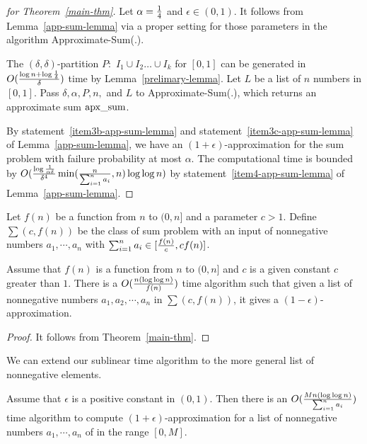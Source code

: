 \documentclass[runningheads]{llncs}
\newcommand{\appsum}{{\rm apx\_sum}}
\begin{document}
\begin{proof}[for Theorem~\ref{main-thm}]
Let $\alpha={1\over 4}$ and $\epsilon\in (0,1)$.  It follows from
Lemma~\ref{app-sum-lemma} via a proper setting for those parameters
in the algorithm Approximate-Sum(.).

 The $(\delta,\delta)$-partition $P:$ $I_1\cup
I_2\ldots \cup I_k$ for $[0,1]$ can be generated in $O({\log n+\log
{1\over \delta}\over \delta})$ time by Lemma~\ref{prelimary-lemma}.
Let $L$ be a list of $n$ numbers in $[0,1]$. Pass $\delta, \alpha,
P, n,$ and $L$ to Approximate-Sum(.), which returns an approximate
sum $\appsum$.

 By statement~\ref{item3b-app-sum-lemma} and
statement~\ref{item3c-app-sum-lemma} of Lemma~\ref{app-sum-lemma},
we have an $(1+\epsilon)$-approximation for the sum problem with
failure probability at most $\alpha$. The computational time is
bounded by $O({\log {1\over \alpha\delta}\over \delta^4}\min({n\over
\sum_{i=1}^n a_i},n)\log\log n)$ by
statement~\ref{item4-app-sum-lemma} of  Lemma~\ref{app-sum-lemma}.
\end{proof}


\begin{definition} Let $f(n)$ be a function from $n$ to $(0,n]$ and a parameter $c>1$.
Define $\sum(c,f(n))$ be the class of sum problem with an input of
nonnegative numbers $a_1,\cdots, a_n$ with $\sum_{i=1}^na_i\in
[{f(n)\over c}, cf(n)]$.
\end{definition}

\begin{corollary} Assume that $f(n)$ is a function from $n$ to $(0,n]$ and $c$ is a given constant $c$ greater than $1$.
There is a $O({n (\log\log n)\over f(n)})$ time algorithm such that
given  a list of nonnegative numbers $a_1,a_2,\cdots, a_n$ in
$\sum(c, f(n))$, it gives a $(1-\epsilon)$-approximation.
\end{corollary}

\begin{proof}
It follows from Theorem~\ref{main-thm}.
\end{proof}



We can extend our sublinear time algorithm to the more general list
of nonnegative elements.

\begin{theorem}
Assume that $\epsilon$ is a positive constant in $(0,1)$. Then there
is an $O({Mn (\log\log n)\over \sum_{i=1}^n a_i})$ time algorithm to
compute $(1+\epsilon)$-approximation for a list of nonnegative
numbers $a_1,\cdots, a_n$ of in the range $[0,M]$.
\end{theorem}
\end{document}
